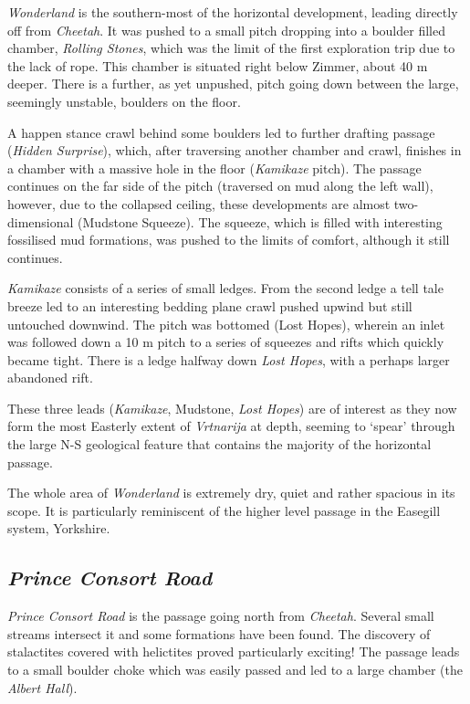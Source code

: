 \emph{Wonderland} is the southern-most of the horizontal development,
leading directly off from \emph{Cheetah}. It was pushed to a small pitch
dropping into a boulder filled chamber, \emph{Rolling Stones}, which was
the limit of the first exploration trip due to the lack of rope. This
chamber is situated right below Zimmer, about 40 m deeper. There is a
further, as yet unpushed, pitch going down between the large, seemingly
unstable, boulders on the floor.

A happen stance crawl behind some boulders led to further drafting
passage (\emph{Hidden Surprise}), which, after traversing another
chamber and crawl, finishes in a chamber with a massive hole in the
floor (\emph{Kamikaze} pitch). The passage continues on the far side of
the pitch (traversed on mud along the left wall), however, due to the
collapsed ceiling, these developments are almost two-dimensional
(Mudstone Squeeze). The squeeze, which is filled with interesting
fossilised mud formations, was pushed to the limits of comfort, although
it still continues.

\emph{Kamikaze} consists of a series of small ledges. From the second
ledge a tell tale breeze led to an interesting bedding plane crawl
pushed upwind but still untouched downwind. The pitch was bottomed (Lost
Hopes), wherein an inlet was followed down a 10 m pitch to a series of
squeezes and rifts which quickly became tight. There is a ledge halfway
down \emph{Lost Hopes}, with a perhaps larger abandoned rift.

These three leads (\emph{Kamikaze}, Mudstone, \emph{Lost Hopes}) are of
interest as they now form the most Easterly extent of \emph{Vrtnarija}
at depth, seeming to `spear' through the large N-S geological feature
that contains the majority of the horizontal passage.

The whole area of \emph{Wonderland} is extremely dry, quiet and rather
spacious in its scope. It is particularly reminiscent of the higher
level passage in the Easegill system, Yorkshire.


\subsection{\texorpdfstring{\emph{Prince Consort
Road}}{Prince Consort Road}}

\emph{Prince Consort Road} is the passage going north from
\emph{Cheetah}. Several small streams intersect it and some formations
have been found. The discovery of stalactites covered with helictites
proved particularly exciting! The passage leads to a small boulder choke
which was easily passed and led to a large chamber (the \emph{Albert
Hall}).

